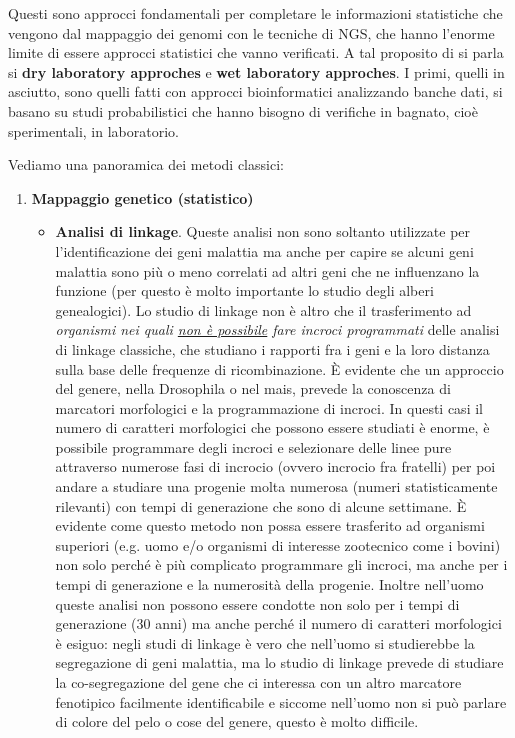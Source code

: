 \documentclass[11pt]{book}
\begin{document}
Questi sono approcci fondamentali per completare le informazioni statistiche che vengono dal mappaggio dei genomi con le tecniche di NGS, che hanno l’enorme limite di essere approcci statistici che vanno verificati. A tal proposito di si parla si \textbf{dry laboratory approches} e \textbf{wet laboratory approches}. I primi, quelli in asciutto, sono quelli fatti con approcci bioinformatici analizzando banche dati, si basano su studi probabilistici che hanno bisogno di verifiche in bagnato, cioè sperimentali, in laboratorio.

Vediamo una panoramica dei metodi classici:
\begin{enumerate} 
\item \textbf{Mappaggio genetico (statistico)}
\begin{itemize}
\item \textbf{Analisi di linkage}. Queste analisi non sono soltanto utilizzate per l’identificazione dei geni malattia ma anche per capire se alcuni geni malattia sono più o meno correlati ad altri geni che ne influenzano la funzione (per questo è molto importante lo studio degli alberi genealogici). Lo studio di linkage non è altro che il trasferimento ad \emph{organismi nei quali \underline{non è possibile} fare incroci programmati} delle analisi di linkage classiche, che studiano i rapporti fra i geni e la loro distanza sulla base delle frequenze di ricombinazione. È evidente che un approccio del genere, nella Drosophila o nel mais, prevede la conoscenza di marcatori morfologici e la programmazione di incroci. In questi casi il numero di caratteri morfologici che possono essere studiati è enorme, è possibile programmare degli incroci e selezionare delle linee pure attraverso numerose fasi di incrocio (ovvero incrocio fra fratelli) per poi andare a studiare una progenie molta numerosa (numeri statisticamente rilevanti) con tempi di generazione che sono di alcune settimane. È evidente come questo metodo non possa essere trasferito ad organismi superiori (e.g. uomo e/o organismi di interesse zootecnico come i bovini) non solo perché è più complicato programmare gli incroci, ma anche per i tempi di generazione e la numerosità della progenie. Inoltre nell’uomo queste analisi non possono essere condotte non solo per i tempi di generazione (30 anni) ma anche perché il numero di caratteri morfologici è esiguo: negli studi di linkage è vero che nell’uomo si studierebbe la segregazione di geni malattia, ma lo studio di linkage prevede di studiare la co-segregazione del gene che ci interessa con un altro marcatore fenotipico facilmente identificabile e siccome nell’uomo non si può parlare di colore del pelo o cose del genere, questo è molto difficile.
 

\end{itemize}
\end{enumerate}
\end{document}
